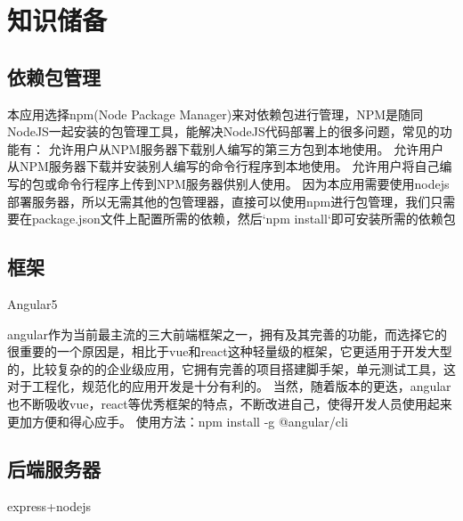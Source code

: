 \chapter{知识储备}
\section{依赖包管理}
\label{sec:dependencies_manage}
本应用选择npm(Node Package Manager)来对依赖包进行管理，NPM是随同NodeJS一起安装的包管理工具，能解决NodeJS代码部署上的很多问题，常见的功能有：
允许用户从NPM服务器下载别人编写的第三方包到本地使用。
允许用户从NPM服务器下载并安装别人编写的命令行程序到本地使用。
允许用户将自己编写的包或命令行程序上传到NPM服务器供别人使用。
因为本应用需要使用nodejs部署服务器，所以无需其他的包管理器，直接可以使用npm进行包管理，我们只需要在package.json文件上配置所需的依赖，然后`npm install`即可安装所需的依赖包

\section{框架}
\label{sec:frame}
Angular5

angular作为当前最主流的三大前端框架之一，拥有及其完善的功能，而选择它的很重要的一个原因是，相比于vue和react这种轻量级的框架，它更适用于开发大型的，比较复杂的的企业级应用，它拥有完善的项目搭建脚手架，单元测试工具，这对于工程化，规范化的应用开发是十分有利的。
当然，随着版本的更迭，angular也不断吸收vue，react等优秀框架的特点，不断改进自己，使得开发人员使用起来更加方便和得心应手。
使用方法：npm install -g @angular/cli

\section{后端服务器}
\label{sec:server}
express+nodejs

